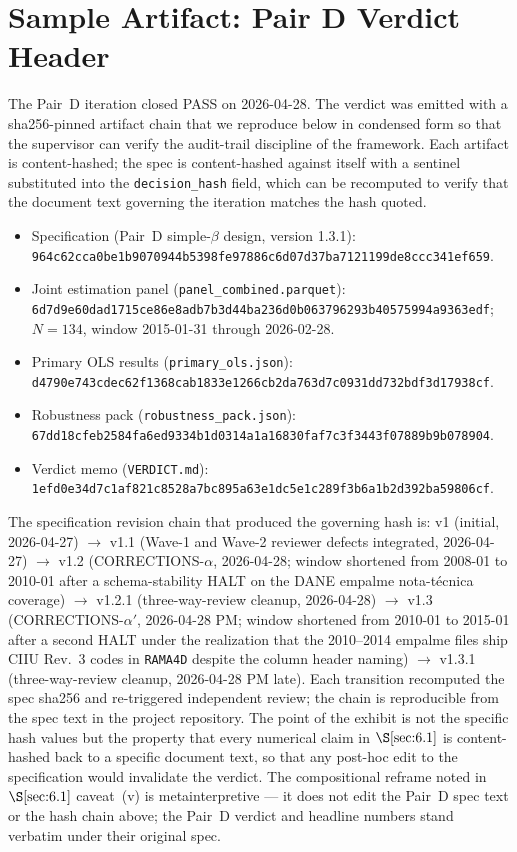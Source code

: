 \section{Sample Artifact: Pair D Verdict Header}\label{app:C}

The Pair~D iteration closed PASS on 2026-04-28. The verdict was
emitted with a sha256-pinned artifact chain that we reproduce below in
condensed form so that the supervisor can verify the audit-trail
discipline of the framework. Each artifact is content-hashed; the
spec is content-hashed against itself with a sentinel substituted into
the \texttt{decision\_hash} field, which can be recomputed to verify
that the document text governing the iteration matches the hash quoted.

\begin{itemize}
  \item Specification (Pair~D simple-\(\beta\) design, version 1.3.1):
    \texttt{964c62cca0be1b9070944b5398fe97886c6d07d37ba7121199de8ccc341ef659}.
  \item Joint estimation panel (\texttt{panel\_combined.parquet}):
    \texttt{6d7d9e60dad1715ce86e8adb7b3d44ba236d0b063796293b40575994a9363edf};
    \(N = 134\), window 2015-01-31 through 2026-02-28.
  \item Primary OLS results (\texttt{primary\_ols.json}):
    \texttt{d4790e743cdec62f1368cab1833e1266cb2da763d7c0931dd732bdf3d17938cf}.
  \item Robustness pack (\texttt{robustness\_pack.json}):
    \texttt{67dd18cfeb2584fa6ed9334b1d0314a1a16830faf7c3f3443f07889b9b078904}.
  \item Verdict memo (\texttt{VERDICT.md}):
    \texttt{1efd0e34d7c1af821c8528a7bc895a63e1dc5e1c289f3b6a1b2d392ba59806cf}.
\end{itemize}

The specification revision chain that produced the governing hash is:
v1 (initial, 2026-04-27) \(\to\) v1.1 (Wave-1 and Wave-2 reviewer
defects integrated, 2026-04-27) \(\to\) v1.2 (CORRECTIONS-\(\alpha\),
2026-04-28; window shortened from 2008-01 to 2010-01 after a
schema-stability HALT on the DANE empalme nota-técnica coverage)
\(\to\) v1.2.1 (three-way-review cleanup, 2026-04-28) \(\to\) v1.3
(CORRECTIONS-\(\alpha'\), 2026-04-28 PM; window shortened from
2010-01 to 2015-01 after a second HALT under the realization that the
2010--2014 empalme files ship CIIU Rev.~3 codes in
\texttt{RAMA4D} despite the column header naming) \(\to\) v1.3.1
(three-way-review cleanup, 2026-04-28 PM late). Each transition
recomputed the spec sha256 and re-triggered independent review; the
chain is reproducible from the spec text in the project repository.
The point of the exhibit is not the specific hash values but the
property that every numerical claim in \(\S\ref{sec:6.1}\) is
content-hashed back to a specific document text, so that any
post-hoc edit to the specification would invalidate the verdict. The
compositional reframe noted in \(\S\ref{sec:6.1}\) caveat~(v) is
metainterpretive --- it does not edit the Pair~D spec text or the
hash chain above; the Pair~D verdict and headline numbers stand
verbatim under their original spec.

